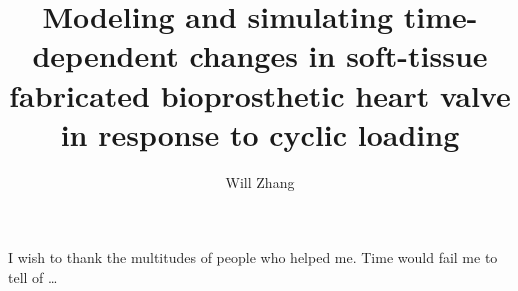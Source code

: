 \documentclass[12pt]{report}
\author{Will Zhang}  	%
\title{Modeling and simulating time-dependent changes in soft-tissue fabricated bioprosthetic heart valve in response to cyclic loading}
\begin{document}
\copyrightpage          %

%
%
\commcertpage           %

\titlepage              %

%

\begin{acknowledgments}		%
%
I wish to thank the multitudes of people who helped me. Time would
fail me to tell of \ldots
\end{acknowledgments}
\end{document}
